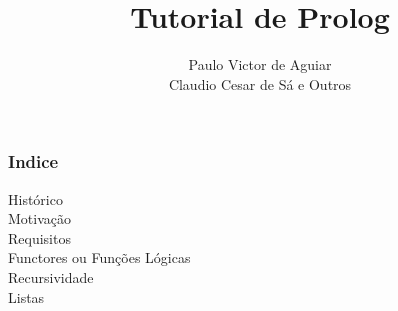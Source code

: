 \documentclass{beamer}
\title{Tutorial de Prolog}
\author{Paulo Victor de Aguiar \\Claudio Cesar de Sá e Outros}
\begin{document}
\begin{frame}[fragile]   %
\maketitle
\end{frame}


\begin{frame}[fragile]   %
\frametitle{Indice}

 Histórico\\
 Motivação\\
 Requisitos\\
 Functores ou Funções Lógicas\\
 Recursividade\\
 Listas\\
\end{frame}
\end{document}

